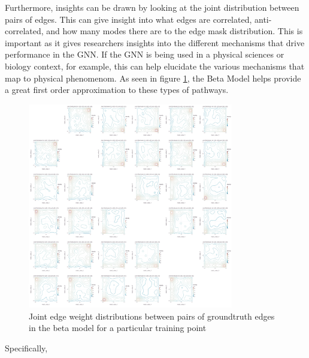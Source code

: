 Furthermore, insights can be drawn by looking at the joint distribution between pairs of edges. This can give insight into what edges are correlated, anti-correlated, and how many modes there are to the edge mask distribution. This is important as it gives researchers insights into the different mechanisms that drive performance in the GNN. If the GNN is being used in a physical sciences or biology context, for example, this can help elucidate the various mechanisms that map to physical phenomenom. As seen in figure \ref{fig:tree-model-beta-joint}, the Beta Model helps provide a great first order approximation to these types of pathways.
\begin{figure}[H]
	\centering
	\includegraphics[width=0.8\textwidth]{images/tree-model-beta-joint.pdf}
	\caption{Joint edge weight distributions between pairs of groundtruth edges in the beta model for a particular training point}
	\label{fig:tree-model-beta-joint}
\end{figure}

Specifically,

